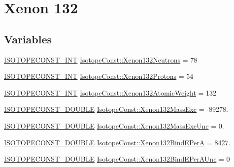 \hypertarget{group___isotope_const-_xenon-_xe132}{}\section{Xenon 132}
\label{group___isotope_const-_xenon-_xe132}
\subsection*{Variables}
\begin{DoxyCompactItemize}
\item 
\mbox{\hyperlink{group___isotope_const-_macros_ga5f18360b3e99483a35c32d789e62621c}{I\+S\+O\+T\+O\+P\+E\+C\+O\+N\+S\+T\+\_\+\+I\+NT}} \mbox{\hyperlink{group___isotope_const-_xenon-_xe132_ga6e8a521724e3b5c30de76ddcf53f1af3}{Isotope\+Const\+::\+Xenon132\+Neutrons}} = 78
\item 
\mbox{\hyperlink{group___isotope_const-_macros_ga5f18360b3e99483a35c32d789e62621c}{I\+S\+O\+T\+O\+P\+E\+C\+O\+N\+S\+T\+\_\+\+I\+NT}} \mbox{\hyperlink{group___isotope_const-_xenon-_xe132_ga0fa8c8f70cb499bf62a079c9946a4ec5}{Isotope\+Const\+::\+Xenon132\+Protons}} = 54
\item 
\mbox{\hyperlink{group___isotope_const-_macros_ga5f18360b3e99483a35c32d789e62621c}{I\+S\+O\+T\+O\+P\+E\+C\+O\+N\+S\+T\+\_\+\+I\+NT}} \mbox{\hyperlink{group___isotope_const-_xenon-_xe132_gaafa63b4d0d9d1639c75dad7de8611aa9}{Isotope\+Const\+::\+Xenon132\+Atomic\+Weight}} = 132
\item 
\mbox{\hyperlink{group___isotope_const-_macros_ga8f45a7272ce02c0b4c65c44636ed719a}{I\+S\+O\+T\+O\+P\+E\+C\+O\+N\+S\+T\+\_\+\+D\+O\+U\+B\+LE}} \mbox{\hyperlink{group___isotope_const-_xenon-_xe132_ga9f69241bb331e556526d9306177dd03b}{Isotope\+Const\+::\+Xenon132\+Mass\+Exc}} = -\/89278.
\item 
\mbox{\hyperlink{group___isotope_const-_macros_ga8f45a7272ce02c0b4c65c44636ed719a}{I\+S\+O\+T\+O\+P\+E\+C\+O\+N\+S\+T\+\_\+\+D\+O\+U\+B\+LE}} \mbox{\hyperlink{group___isotope_const-_xenon-_xe132_ga4a940fc7fe41e1288afce93fbcd7acb8}{Isotope\+Const\+::\+Xenon132\+Mass\+Exc\+Unc}} = 0.
\item 
\mbox{\hyperlink{group___isotope_const-_macros_ga8f45a7272ce02c0b4c65c44636ed719a}{I\+S\+O\+T\+O\+P\+E\+C\+O\+N\+S\+T\+\_\+\+D\+O\+U\+B\+LE}} \mbox{\hyperlink{group___isotope_const-_xenon-_xe132_gae9c76dedcff8543f7ffca27d386b825f}{Isotope\+Const\+::\+Xenon132\+Bind\+E\+PerA}} = 8427.
\item 
\mbox{\hyperlink{group___isotope_const-_macros_ga8f45a7272ce02c0b4c65c44636ed719a}{I\+S\+O\+T\+O\+P\+E\+C\+O\+N\+S\+T\+\_\+\+D\+O\+U\+B\+LE}} \mbox{\hyperlink{group___isotope_const-_xenon-_xe132_ga55385716c13e503bbce2cfb4be273692}{Isotope\+Const\+::\+Xenon132\+Bind\+E\+Per\+A\+Unc}} = 0

\end{DoxyCompactItemize}
